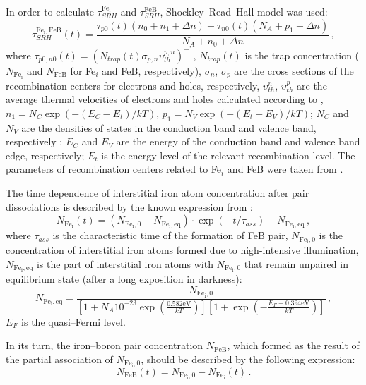 \documentclass[sn-mathphys]{sn-jnl}%
\theoremstyle{thmstyleone}%
\theoremstyle{thmstyletwo}%
\theoremstyle{thmstylethree}%
\begin{document}
In order to calculate $\tau_{SRH}^{\mathrm{Fe_i}}$  and $\tau_{SRH}^\mathrm{FeB}$,
Shockley--Read--Hall model was used:
\begin{equation}
\label{eqTauSRH}
\tau_{SRH}^{\mathrm{Fe_i,FeB}}(t)=\frac{\tau_{p0}(t)(n_0+n_1+\Delta n)+\tau_{n0}(t)(N_A+p_1+\Delta n)}
                             {N_A+n_0+\Delta n}\,,
\end{equation}
where
$\tau_{p0,n0}(t)=(N_{trap}(t) \sigma_{p,n}\upsilon_{th}^{p,n})^{-1}$,
$N_{trap}(t)$ is the trap concentration
($N_\mathrm{Fe_i}$ and $N_\mathrm{FeB}$ for Fe$_i$ and FeB, respectively),
$\sigma_n$, $\sigma_p$  are the cross sections of the recombination centers for electrons and holes, respectively,
$\upsilon_{th}^{n}$, $\upsilon_{th}^{p}$ are the average thermal velocities of electrons and holes calculated according to \cite{Nc:Green},
$n_1=N_C \exp(-(E_C-E_t)/kT)$,
$p_1=N_V \exp(-(E_t-E_V)/kT)$;
$N_C$ and $N_V$ are the densities of
states in the conduction band and valence band, respectively \cite{Si_ni_Couderc};
$E_C$ and $E_V$ are the energy of the conduction band and
valence band edge, respectively;
$E_t$ is the energy level of the relevant recombination level.
The parameters of recombination centers related to Fe$_i$ and FeB were taken from \cite{ROUGIEUX2018}.


The time dependence of interstitial iron atom concentration
after pair dissociations is described by the known expression from \cite{MurphyJAP2011}:
\begin{equation}
\label{eqNFet}
N_\mathrm{Fe_i}(t)=(N_\mathrm{Fe_i,0}-N_\mathrm{Fe_i,eq})\cdot
\exp(-t/\tau_{ass})+N_\mathrm{Fe_i,eq}\,,
\end{equation}
where
$\tau_{ass}$ is the characteristic time of the formation of FeB pair,
$N_\mathrm{Fe_i,0}$ is the concentration of interstitial iron atoms
formed due to high-intensive illumination,
$N_\mathrm{Fe_i,eq}$ is the part of interstitial iron atoms with $N_\mathrm{Fe_i,0}$
that remain unpaired in equilibrium state (after a long exposition in darkness)\cite{FeB:kinetic}:
\begin{equation}
\label{eqNFeeq}
N_\mathrm{Fe_i,eq}=\frac{N_\mathrm{Fe_i,0}}
   {\left[1+N_A 10^{-23}\exp\left(\frac{0.582\mathrm{eV}}{kT}\right)\right]
    \left[1+\exp\left(-\frac{E_F-0.394\mathrm{eV}}{kT}\right)\right]}\,,
\end{equation}
$E_F$ is the quasi--Fermi level.


In its turn, the iron–boron pair concentration $N_\mathrm{FeB}$, which
formed as the result of the partial association of $N_\mathrm{Fe_i,0}$,
should be described by the following expression:
\begin{equation}
\label{eqNFeBt}
N_\mathrm{FeB}(t)=N_\mathrm{Fe_i,0}-N_\mathrm{Fe_i}(t)\,.
\end{equation}
\end{document}
